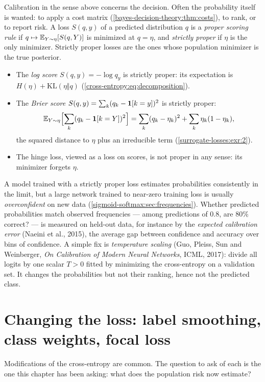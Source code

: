 \begin{notechapter}
Calibration in the sense above concerns the decision. Often the probability
itself is wanted: to apply a cost matrix (\cref{bayes-decision-theory:thm:costs}), to rank, or to
report risk. A loss $S(q, y)$ of a predicted distribution $q$ is a \emph{proper scoring rule}
if $q\mapsto\mathbb{E}_{Y\sim\eta}[S(q, Y)]$ is minimized at $q = \eta$, and \emph{strictly proper} if $\eta$ is the only
minimizer. Strictly proper losses are the ones whose population minimizer is the
true posterior.
\begin{itemize}[nosep]
  \item The \emph{log score} $S(q, y) = -\log q_y$ is strictly proper: its expectation is
        $H(\eta) + \mathrm{KL}(\eta\Vert q)$ (\cref{cross-entropy:eq:decomposition}).
  \item The \emph{Brier score} $S(q, y) = \sum_k(q_k - \mathbf{1}[k = y])^2$ is strictly proper:
        \[
          \mathbb{E}_{Y\sim\eta}\Bigl[\sum_k(q_k - \mathbf{1}[k = Y])^2\Bigr] = \sum_k(q_k - \eta_k)^2 + \sum_k\eta_k(1 - \eta_k),
        \]
        the squared distance to $\eta$ plus an irreducible term (\cref{surrogate-losses:exr:2}).
  \item The hinge loss, viewed as a loss on scores, is not proper in any sense: its
        minimizer forgets $\eta$.
\end{itemize}
A model trained with a strictly proper loss estimates probabilities consistently
in the limit, but a large network trained to near-zero training loss is usually
\emph{overconfident} on new data (\cref{sigmoid-softmax:sec:frequencies}). Whether predicted
probabilities match observed frequencies --- among predictions of $0.8$, are $80\%$
correct? --- is measured on held-out data, for instance by the \emph{expected
calibration error} (Naeini et al., 2015), the average gap between confidence and accuracy
over bins of confidence. A simple fix is \emph{temperature scaling} (Guo, Pleiss, Sun and
Weinberger, \emph{On Calibration of Modern Neural Networks}, ICML, 2017): divide all
logits by one scalar $T>0$ fitted by minimizing the cross-entropy on a validation set.
It changes the probabilities but not their ranking, hence not the predicted class.

\section{Changing the loss: label smoothing, class weights, focal loss}\label{surrogate-losses:sec:beyond}

Modifications of the cross-entropy are common. The question to ask of each is the
one this chapter has been asking: what does the population risk now estimate?


\end{notechapter}
